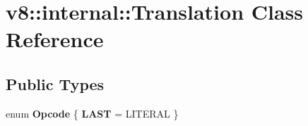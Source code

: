 \hypertarget{classv8_1_1internal_1_1Translation}{}\section{v8\+:\+:internal\+:\+:Translation Class Reference}
\label{classv8_1_1internal_1_1Translation}
\subsection*{Public Types}
\begin{DoxyCompactItemize}
\item 
\mbox{\label{classv8_1_1internal_1_1Translation_a130e9d6fcd45b2819bbe3378feaa27e8}} 
enum {\bfseries Opcode} \{ {\bfseries L\+A\+ST} = L\+I\+T\+E\+R\+AL
 \}
\end{DoxyCompactItemize}
